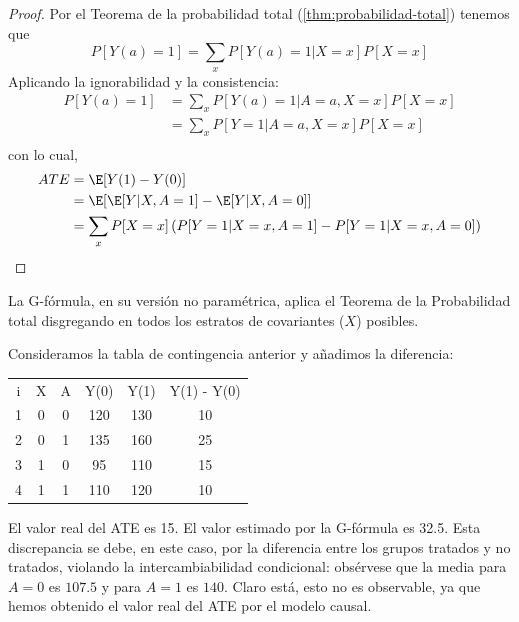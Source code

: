 \begin{proof}\cite[material suplementario S1]{luque2021}
	Por el Teorema de la probabilidad total (\ref{thm:probabilidad-total}) tenemos que
	$$
		P[Y(a) = 1 ] = \sum_x P[Y(a) = 1 | X = x]P[X = x]
	$$
	Aplicando la ignorabilidad y la consistencia: %
	\begin{align*}
		P[Y(a) = 1] & = \sum_x P[Y(a) = 1 | A = a, X = x]P[X = x] \\
		            & = \sum_x P[Y = 1 | A = a, X = x]P[X = x]    \\
	\end{align*}
	con lo cual,
	\begin{align*}
		ATE & = \E[Y(1) - Y(0)]                                                                \\
		    & = \E[\E[Y | X, A = 1] - \E[Y | X, A = 0]]                                        \\
		    & = \sum_x P[X = x] \left(P[Y = 1 | X = x, A = 1] - P[Y = 1 | X = x, A = 0]\right)
	\end{align*}

\end{proof}

\begin{observacion}
	La G-fórmula, en su versión no paramétrica, aplica el Teorema de la Probabilidad total
	disgregando en todos los estratos de covariantes ($X$) posibles.
\end{observacion}


\begin{ejemplo}[ATE]
	Consideramos la tabla de contingencia anterior y añadimos la diferencia:
	\begin{center}
		\begin{tabular}{ C | C C | C C | C}
			i & X & A & Y(0) & Y(1) & Y(1) - Y(0) \\
			1 & 0 & 0 & 120  & 130  & 10          \\
			2 & 0 & 1 & 135  & 160  & 25          \\
			3 & 1 & 0 & 95   & 110  & 15          \\
			4 & 1 & 1 & 110  & 120  & 10
		\end{tabular}
	\end{center}
	El valor real del ATE es 15. El valor estimado por la G-fórmula es 32.5. Esta discrepancia se debe, en este caso,
	por la diferencia entre los grupos tratados y no tratados, violando la intercambiabilidad condicional:
	obsérvese que la media para $A = 0$ es $107.5$ y para $A=1$ es $140$.
	Claro está, esto no es observable, ya que hemos obtenido el valor real del ATE por el modelo causal.
\end{ejemplo}

